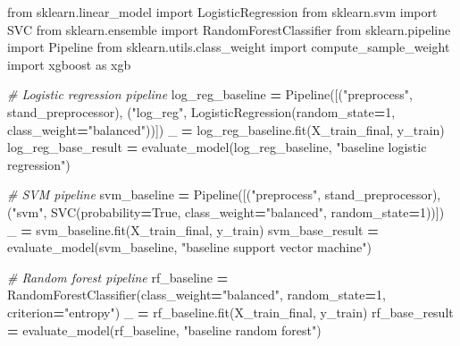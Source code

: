 \documentclass[a4paper, oneside]{report}
\newenvironment{Shaded}{\begin{snugshade}}{\end{snugshade}}
\newcommand{\CommentTok}[1]{\textcolor[rgb]{0.56,0.35,0.01}{\textit{#1}}}
\newcommand{\DecValTok}[1]{\textcolor[rgb]{0.00,0.00,0.81}{#1}}
\newcommand{\ImportTok}[1]{#1}
\newcommand{\NormalTok}[1]{#1}
\newcommand{\OperatorTok}[1]{\textcolor[rgb]{0.81,0.36,0.00}{\textbf{#1}}}
\newcommand{\StringTok}[1]{\textcolor[rgb]{0.31,0.60,0.02}{#1}}
\newcommand{\VariableTok}[1]{\textcolor[rgb]{0.00,0.00,0.00}{#1}}
\renewenvironment{Shaded}
{
  \vspace{4pt}%
  \begin{snugshade}%
}{%
  \end{snugshade}%
  \vspace{4pt}%
}
\begin{document}
\begin{Shaded}
\begin{Highlighting}[]
\ImportTok{from}\NormalTok{ sklearn.linear\_model }\ImportTok{import}\NormalTok{ LogisticRegression}
\ImportTok{from}\NormalTok{ sklearn.svm }\ImportTok{import}\NormalTok{ SVC}
\ImportTok{from}\NormalTok{ sklearn.ensemble }\ImportTok{import}\NormalTok{ RandomForestClassifier}
\ImportTok{from}\NormalTok{ sklearn.pipeline }\ImportTok{import}\NormalTok{ Pipeline}
\ImportTok{from}\NormalTok{ sklearn.utils.class\_weight }\ImportTok{import}\NormalTok{ compute\_sample\_weight}
\ImportTok{import}\NormalTok{ xgboost }\ImportTok{as}\NormalTok{ xgb}

\CommentTok{\# Logistic regression pipeline}
\NormalTok{log\_reg\_baseline }\OperatorTok{=}\NormalTok{ Pipeline([(}\StringTok{"preprocess"}\NormalTok{, stand\_preprocessor), }
\NormalTok{                             (}\StringTok{"log\_reg"}\NormalTok{, LogisticRegression(random\_state}\OperatorTok{=}\DecValTok{1}\NormalTok{,  }
\NormalTok{                                                            class\_weight}\OperatorTok{=}\StringTok{"balanced"}\NormalTok{))])}
\NormalTok{\_ }\OperatorTok{=}\NormalTok{ log\_reg\_baseline.fit(X\_train\_final, y\_train)}
\NormalTok{log\_reg\_base\_result }\OperatorTok{=}\NormalTok{ evaluate\_model(log\_reg\_baseline, }\StringTok{"baseline logistic regression"}\NormalTok{)}

\CommentTok{\# SVM pipeline}
\NormalTok{svm\_baseline }\OperatorTok{=}\NormalTok{ Pipeline([(}\StringTok{"preprocess"}\NormalTok{, stand\_preprocessor), }
\NormalTok{                         (}\StringTok{"svm"}\NormalTok{, SVC(probability}\OperatorTok{=}\VariableTok{True}\NormalTok{, class\_weight}\OperatorTok{=}\StringTok{"balanced"}\NormalTok{, random\_state}\OperatorTok{=}\DecValTok{1}\NormalTok{))])}
\NormalTok{\_ }\OperatorTok{=}\NormalTok{ svm\_baseline.fit(X\_train\_final, y\_train)}
\NormalTok{svm\_base\_result }\OperatorTok{=}\NormalTok{ evaluate\_model(svm\_baseline, }\StringTok{"baseline support vector machine"}\NormalTok{)}

\CommentTok{\# Random forest pipeline}
\NormalTok{rf\_baseline }\OperatorTok{=}\NormalTok{ RandomForestClassifier(class\_weight}\OperatorTok{=}\StringTok{"balanced"}\NormalTok{, random\_state}\OperatorTok{=}\DecValTok{1}\NormalTok{, criterion}\OperatorTok{=}\StringTok{"entropy"}\NormalTok{)}
\NormalTok{\_ }\OperatorTok{=}\NormalTok{ rf\_baseline.fit(X\_train\_final, y\_train)}
\NormalTok{rf\_base\_result }\OperatorTok{=}\NormalTok{ evaluate\_model(rf\_baseline, }\StringTok{"baseline random forest"}\NormalTok{)}


\end{Highlighting}
\end{Shaded}
\end{document}
